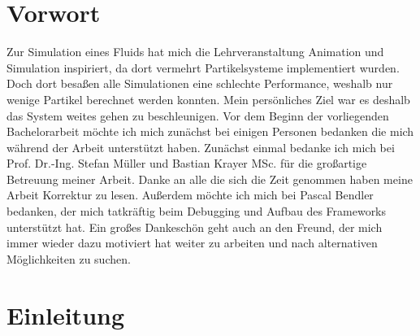 \documentclass[intern,palatino]{cgBA}
\begin{document}

\section{Vorwort}\label{vorwort}

Zur Simulation eines Fluids hat mich die Lehrveranstaltung Animation und Simulation inspiriert, da dort vermehrt Partikelsysteme implementiert wurden. Doch dort besaßen alle Simulationen eine schlechte Performance, weshalb nur wenige Partikel berechnet werden konnten. Mein persönliches Ziel war es deshalb das System weites gehen zu beschleunigen.
\newline \newline
Vor dem Beginn der vorliegenden Bachelorarbeit möchte ich mich zunächst bei einigen Personen bedanken die mich während der Arbeit unterstützt haben.
\newline \newline
Zunächst einmal bedanke ich mich bei Prof. Dr.-Ing. Stefan Müller und Bastian Krayer MSc. für die großartige Betreuung meiner Arbeit.
\newline
Danke  an alle die sich die Zeit genommen haben meine Arbeit Korrektur zu lesen.
\newline
Außerdem möchte ich mich bei Pascal Bendler bedanken, der mich tatkräftig beim Debugging und Aufbau des Frameworks unterstützt hat.
\newline
Ein großes Dankeschön geht auch an den Freund, der mich immer wieder dazu motiviert hat weiter zu arbeiten und nach alternativen Möglichkeiten zu suchen.
\newpage


\section{Einleitung}\label{einleitung}
\end{document}
